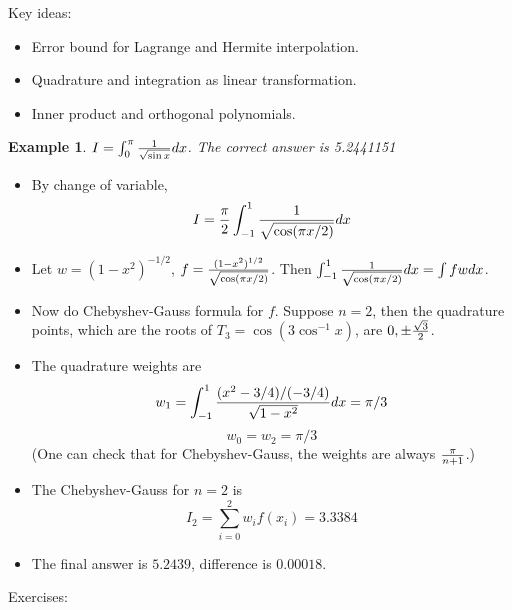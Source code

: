\documentclass[20pt]{article} %
\theoremstyle{break}
\newtheorem{exa}[definition]{Example}
\begin{document}
Key ideas:

\begin{itemize}
\item Error bound for Lagrange and Hermite interpolation.
\item Quadrature and integration as linear transformation.
\item Inner product and orthogonal polynomials.
\end{itemize}

\newpage

\begin{exa}$I=\int_0^\pi{1\over \sqrt{\sin x}}dx$. The correct answer is 5.2441151\end{exa}

\begin{itemize}
\item By change of variable,
  \[I={\pi\over 2}\int_{-1}^1{1\over\sqrt{\cos (\pi x/2)}}dx\]
\item Let $w=(1-x^2)^{-1/2}$, $f={(1-x^2)^{1/2}\over\sqrt{\cos (\pi x/2)}}$. Then $\int_{-1}^1{1\over\sqrt{\cos (\pi x/2)}}dx=\int fwdx$.
\item Now do Chebyshev-Gauss formula for $f$. Suppose $n=2$, then the quadrature points, which are the roots of $T_3=\cos(3\cos^{-1}x)$, are $0, \pm{\sqrt{3}\over 2}$.
\item The quadrature weights are
  \[w_1=\int_{-1}^1{(x^2-3/4)/(-3/4)\over\sqrt{1-x^2}}dx=\pi/3\]
  \[w_0=w_2=\pi/3\]
  (One can check that for Chebyshev-Gauss, the weights are always $\pi\over n+1$.)
\item The Chebyshev-Gauss for $n=2$ is
  \[I_2=\sum_{i=0}^2w_if(x_i)=3.3384\]
\item The final answer is $5.2439$, difference is $0.00018$.
\end{itemize}

\newpage

Exercises:
\end{document}
